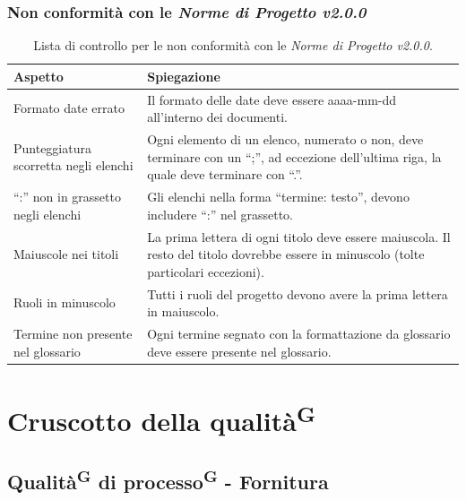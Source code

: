 \documentclass[8pt]{article}
\newcommand{\glossterm}[1]{#1\textsuperscript{G}} %
\begin{document}
\subsubsection{Non conformità con le \textit{Norme di Progetto v2.0.0}}
\renewcommand{\arraystretch}{2.5}
\begin{longtable}{|>{\centering}p{5cm}|>{\centering\arraybackslash}p{10cm}|}
\hline
\rowcolor{white}
    \textbf{Aspetto} & \textbf{Spiegazione} \\
\hline
\endfirsthead
\rowcolor{white}
    \caption{Lista di controllo per le non conformità con le \textit {Norme di Progetto v2.0.0}.}
    \label{table: Lista di controllo per le non conformità con le Norme di Progetto}
\endlastfoot
    Formato date errato & Il formato delle date deve essere aaaa-mm-dd all'interno dei documenti. \\
    \hline
    Punteggiatura scorretta negli elenchi &  Ogni elemento di un elenco, numerato o non, deve terminare con un ``;”, ad eccezione dell'ultima riga, la quale deve terminare con ``.”. \\ 
    \hline
    ``:” non in grassetto negli elenchi & Gli elenchi nella forma ``termine: testo”, devono
    includere ``:” nel grassetto. \\
    \hline
    Maiuscole nei titoli & La prima lettera di ogni titolo deve essere maiuscola. Il resto del
    titolo dovrebbe essere in minuscolo (tolte particolari eccezioni). \\
    \hline
    Ruoli in minuscolo & Tutti i ruoli del progetto devono avere la prima lettera in maiuscolo. \\
    \hline
    Termine non presente nel glossario & Ogni termine segnato con la formattazione da glossario deve essere presente nel glossario. \\
\hline
\end{longtable}
\newpage
\section{Cruscotto della \glossterm{qualità}}\label{sec:cruscotto della qualita}
\subsection{\glossterm{Qualità} di \glossterm{processo} - Fornitura}
\end{document}
